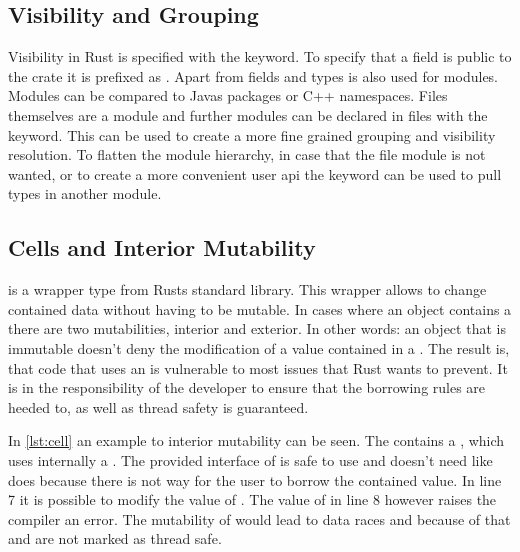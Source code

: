 \documentclass[thesis]{subfiles}
\begin{document}
  \subsection{Visibility and Grouping}
    Visibility in Rust is specified with the \pub keyword.
    To specify that a field is public to the crate it is prefixed as .
    Apart from fields and types \pub is also used for modules.
    Modules can be compared to Javas packages or C++ namespaces.
    Files themselves are a module and further modules can be declared in files with the \mod keyword.
    This can be used to create a more fine grained grouping and visibility resolution.
    To flatten the module hierarchy, in case that the file module is not wanted, or to create a more convenient user \gls{api} the \use keyword can be used to pull types in another module.
    \autocite[Visibility and Privacy, Use declarations]{rust-ref}

  \subsection{Cells and Interior Mutability}\label{sec:cell}
    \UnsafeCellT is a wrapper type from Rusts standard library.
    This wrapper allows to change contained data without having to be mutable.
    In cases where an object contains a \UnsafeCellT there are two mutabilities, interior and exterior.
    In other words: an object that is immutable doesn't deny the modification of a value contained in a \UnsafeCellT.
    The result is, that code that uses an \UnsafeCellT is vulnerable to most issues that Rust wants to prevent.
    It is in the responsibility of the developer to ensure that the borrowing rules are heeded to, as well as thread safety is guaranteed.\autocite[std::cell]{rust-doc}


    In \autoref{lst:cell} an example to interior mutability can be seen.
    The \struct \Foo contains a \CellT, which uses internally a \UnsafeCellT.
    The provided interface of \CellT is safe to use and doesn't need \unsafe like \UnsafeCellT does because there is not way for the user to borrow the contained value.
    In line 7 it is possible to modify the value of \x.
    The value of \y in line 8 however raises the compiler an error.
    The mutability of \x would lead to data races and because of that \CellT and \RefCellT are not marked as thread safe\autocites[std::cell]{rust-doc}[Send and Sync]{rust-nom}.
\end{document}
